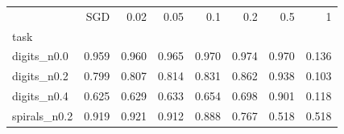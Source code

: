 \begin{tabular}{lrrrrrrr}
\toprule
 & SGD & 0.02 & 0.05 & 0.1 & 0.2 & 0.5 & 1 \\
task &  &  &  &  &  &  &  \\
\midrule
digits\_n0.0 & 0.959 & 0.960 & 0.965 & 0.970 & 0.974 & 0.970 & 0.136 \\
digits\_n0.2 & 0.799 & 0.807 & 0.814 & 0.831 & 0.862 & 0.938 & 0.103 \\
digits\_n0.4 & 0.625 & 0.629 & 0.633 & 0.654 & 0.698 & 0.901 & 0.118 \\
spirals\_n0.2 & 0.919 & 0.921 & 0.912 & 0.888 & 0.767 & 0.518 & 0.518 \\
\bottomrule
\end{tabular}
